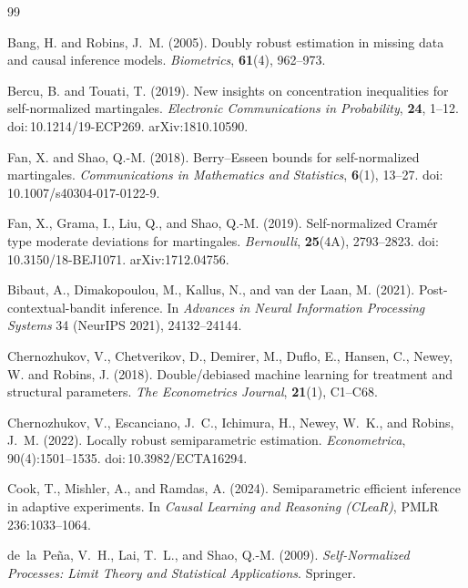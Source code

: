 \documentclass[11pt]{article}
\numberwithin{equation}{section}
\theoremstyle{plain}
\theoremstyle{definition}
\theoremstyle{remark}
\newcommand{\doi}[1]{doi:\,#1}
\newcommand{\arxiv}[1]{arXiv:#1}
\begin{document}
\newpage
\begin{thebibliography}{99}

Bang, H. and Robins, J.~M. (2005).
Doubly robust estimation in missing data and causal inference models.
\emph{Biometrics}, \textbf{61}(4), 962--973.



Bercu, B. and Touati, T. (2019).
New insights on concentration inequalities for self-normalized martingales.
\emph{Electronic Communications in Probability}, \textbf{24}, 1--12. \doi{10.1214/19-ECP269}. \arxiv{1810.10590}.

Fan, X. and Shao, Q.-M. (2018).
Berry--Esseen bounds for self-normalized martingales.
\emph{Communications in Mathematics and Statistics}, \textbf{6}(1), 13--27. \doi{10.1007/s40304-017-0122-9}.

Fan, X., Grama, I., Liu, Q., and Shao, Q.-M. (2019).
Self-normalized Cram{\'e}r type moderate deviations for martingales.
\emph{Bernoulli}, \textbf{25}(4A), 2793--2823. \doi{10.3150/18-BEJ1071}. \arxiv{1712.04756}.

Bibaut, A., Dimakopoulou, M., Kallus, N., and van der Laan, M. (2021).
Post-contextual-bandit inference.
In \emph{Advances in Neural Information Processing Systems} 34 (NeurIPS 2021), 24132--24144.

Chernozhukov, V., Chetverikov, D., Demirer, M., Duflo, E., Hansen, C., Newey, W. and Robins, J. (2018).
Double/debiased machine learning for treatment and structural parameters.
\emph{The Econometrics Journal}, \textbf{21}(1), C1--C68.

Chernozhukov, V., Escanciano, J.~C., Ichimura, H., Newey, W.~K., and Robins, J.~M. (2022).
Locally robust semiparametric estimation.
\emph{Econometrica}, 90(4):1501--1535. \doi{10.3982/ECTA16294}.

Cook, T., Mishler, A., and Ramdas, A. (2024).
Semiparametric efficient inference in adaptive experiments.
In \emph{Causal Learning and Reasoning (CLeaR)}, PMLR 236:1033--1064.

de~la~Pe\~na, V.~H., Lai, T.~L., and Shao, Q.-M. (2009).
\emph{Self-Normalized Processes: Limit Theory and Statistical Applications}.
Springer.


\end{thebibliography}
\end{document}
